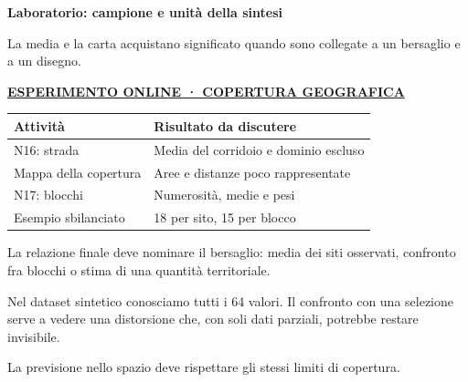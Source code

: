 \documentclass[12pt,aspectratio=1610]{beamer}
\newcommand{\PBody}[1]{\par{\fontsize{11.3}{14.8}\selectfont #1\par}}
\newcommand{\PSmall}[1]{\par{\fontsize{9.8}{13.1}\selectfont #1\par}}
\newcommand{\PInfo}[1]{%
\begin{tcolorbox}[enhanced,arc=1.6mm,boxrule=.55pt,colback=GeoTint,
 colframe=Rule!80!Classical,left=2.3mm,right=2.3mm,top=2mm,bottom=2mm,
 before skip=1mm,after skip=1mm]
\PSmall{#1}\end{tcolorbox}}
\newcommand{\PLab}[2]{\par{\color{Classical}\bfseries\fontsize{9}{11}\selectfont
\href{#1}{\MakeUppercase{#2}}}\par\vspace{1.8mm}}
\begin{document}
\begin{frame}[plain]\hypertarget{slide91}{}
\begin{lrbox}{\TitleBox}
\begin{minipage}[t]{17.7cm}\raggedright\color{Ink}\fontsize{11.3}{14.8}\selectfont
\color{Navy}\bfseries\fontsize{20.6}{24.5}\selectfont Laboratorio: campione e unità della sintesi
\end{minipage}\end{lrbox}

\begin{lrbox}{\RecallBox}
\begin{minipage}[t]{14.3cm}\raggedright\color{Ink}\fontsize{11.3}{14.8}\selectfont
\fontsize{10.3}{13.8}\selectfont La media e la carta acquistano significato quando sono collegate a un bersaglio e a un disegno.
\end{minipage}\end{lrbox}

\begin{lrbox}{\PilotLeftBox}
\begin{minipage}[t]{10.05cm}\raggedright\color{Ink}\fontsize{11.3}{14.8}\selectfont
\PLab{https://marzione00.github.io/Lab_Geo/\#laboratorio/m11-copertura}{Esperimento online · copertura geografica}
{\fontsize{10.2}{13.1}\selectfont\renewcommand{\arraystretch}{1.45}\begin{tabular}{@{}p{4.0cm}p{5.0cm}@{}}\toprule
\textbf{Attività} & \textbf{Risultato da discutere}\\\midrule
N16: strada & Media del corridoio e dominio escluso\\
Mappa della copertura & Aree e distanze poco rappresentate\\
N17: blocchi & Numerosità, medie e pesi\\
Esempio sbilanciato & 18 per sito, 15 per blocco\\
\bottomrule\end{tabular}}

\end{minipage}\end{lrbox}

\begin{lrbox}{\PilotRightBox}
\begin{minipage}[t]{7.55cm}\raggedright\color{Ink}\fontsize{11.3}{14.8}\selectfont
\PBody{La relazione finale deve nominare il bersaglio: media dei siti osservati, confronto fra blocchi o stima di una quantità territoriale.}
\vspace{2.5mm}
\PInfo{Nel dataset sintetico conosciamo tutti i 64 valori. Il confronto con una selezione serve a vedere una distorsione che, con soli dati parziali, potrebbe restare invisibile.}
\PBody{La previsione nello spazio deve rispettare gli stessi limiti di copertura.}
\vspace{2.5mm}


\end{minipage}
\end{lrbox}
\end{frame}
\end{document}
